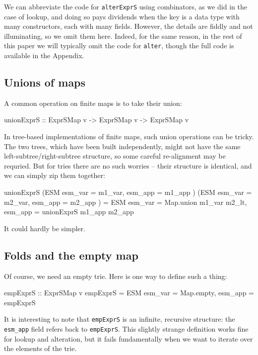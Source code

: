 \documentclass[acmsmall]{acmart}
\theoremstyle{theorem}
\theoremstyle{definition}
\theoremstyle{remark}
\begin{document}
We can abbreviate the code for \lstinline{alterExprS} using combinators, as we did in the case of
lookup, and doing so pays dividends when the key is a data type with
many constructors, each with many fields.  However, the details are
fiddly and not illuminating, so we omit them here.  Indeed, for the
same reason, in the rest of this paper we will typically omit the code
for \lstinline{alter}, though the full code is available in the
Appendix.

\subsection{Unions of maps}

A common operation on finite maps is to take their union:
\begin{code}
unionExprS :: ExprSMap v -> ExprSMap v -> ExprSMap v
\end{code}
In tree-based implementations of finite maps, such union operations can be tricky.
The two trees, which have been built independently, might not have the same
left-subtree/right-subtree structure, so some careful re-alignment may be requried.
But for tries there are no such worries --
their structure is identical, and we can simply zip them together:
\begin{code}
unionExprS (ESM { esm_var = m1_var, esm_app = m1_app })
           (ESM { esm_var = m2_var, esm_app = m2_app })
   = ESM { esm_var = Map.union m1_var m2_lt, esm_app = unionExprS m1_app m2_app }
\end{code}
It could hardly be simpler.

\subsection{Folds and the empty map} \label{sec:fold}

Of course, we need an empty trie. Here is one way to define such a thing:
\begin{code}
empExprS :: ExprSMap v
empExprS = ESM { esm_var = Map.empty, esm_app = empExprS }
\end{code}
It is interesting to note that \lstinline{empExprS} is an infinite, recursive structure:
the \lstinline{esm_app} field refers back to \lstinline{empExprS}.
This slightly strange definition works fine for lookup and alteration, but it fails
fundamentally when we want to iterate over the elements of the trie.
\end{document}
